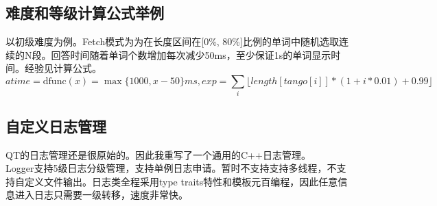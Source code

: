 \documentclass[UTF8]{ctexart}
\newcommand{\floor}[1]{\lfloor{{}#1}\rfloor}
\begin{document}
\subsection{难度和等级计算公式举例}
以初级难度为例。Fetch模式为为在长度区间在[0\%, 80\%]比例的单词中随机选取连续的N段。回答时间随着单词个数增加每次减少50ms，至少保证1s的单词显示时间。经验见计算公式。
$$
    atime=\text{dfunc}(x)=\max\{1000, x-50\}ms, exp=\sum_{i}\floor{ length[tango[i]] * (1 + i * 0.01) + 0.99}
$$
\subsection{自定义日志管理}
QT的日志管理还是很原始的。因此我重写了一个通用的C++日志管理。\\
\indent Logger支持5级日志分级管理，支持单例日志申请。暂时不支持支持多线程，不支持自定义文件输出。日志类全程采用type traits特性和模板元百编程，因此任意信息进入日志只需要一级转移，速度非常快。
\end{document}
